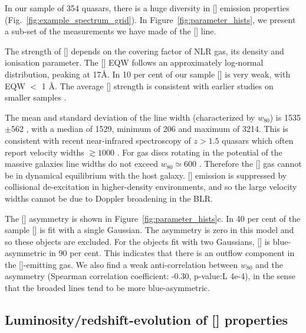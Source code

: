 In our sample of 354 quasars, there is a huge diversity in [] emission properties (Fig.~\ref{fig:example_spectrum_grid}). 
In Figure~\ref{fig:parameter_hists}, we present a sub-set of the measurements we have made of the [] line.  

The strength of [] depends on the covering factor of NLR gas, its density and ionisation parameter. 
The [] EQW follows an approximately log-normal distribution, peaking at 17\AA. 
In 10 per cent of our sample [] is very weak, with EQW $<$ 1 \AA. 
The average [] strength is consistent with earlier studies on smaller samples \citep[e.g.][]{sulentic04,netzer04,shen16a}.

The mean and standard deviation of the line width (characterized by $w_{80}$) is 1535$\pm$562 \kms, with a median of 1529, minimum of 206 and maximum of 3214. 
This is consistent with recent near-infrared spectroscopy of $z>1.5$ quasars which often report velocity widths $\gtrsim1000$ \kms \citep[e.g.][]{netzer04,kim13,brusa15,shen16a}. 
For gas discs rotating in the potential of the massive galaxies line widths do not exceed $w_{80}\simeq600$ \kms \citep{liu13}. 
Therefore the [] gas cannot be in dynamical equilibrium with the host galaxy. 
[] emission is suppressed by collisional de-excitation in higher-density environments, and so the large velocity widths cannot be due to Doppler broadening in the BLR. 

The [] asymmetry is shown in Figure~\ref{fig:parameter_hists}c. 
In 40 per cent of the sample [] is fit with a single Gaussian. 
The asymmetry is zero in this model and so these objects are excluded. 
For the objects fit with two Gaussians, [] is blue-asymmetric in 90 per cent. 
This indicates that there is an outflow component in the []-emitting gas. 
We also find a weak anti-correlation between $w_{80}$ and the asymmetry (Spearman correlation coefficient: -0.30, p-value:L 4e-4), in the sense that the broaded lines tend to be more blue-asymmetric.  

\subsection{Luminosity/redshift-evolution of [] properties}

